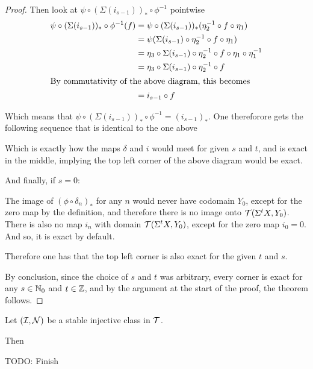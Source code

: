 \begin{proof}
    Then look at \( \psi \circ (\Sigma(i_{s-1}))_* \circ \phi^{-1} \) pointwise
    \begin{align*}
        \psi \circ (\Sigma(i_{s-1}))_* \circ \phi^{-1} ( f ) &= \psi \circ (\Sigma(i_{s-1}))_* ( \eta_2^{-1} \circ f \circ \eta_1 ) \\
        &= \psi ( \Sigma(i_{s - 1}) \circ \eta_2^{-1} \circ f \circ \eta_1 ) \\
        &= \eta_3 \circ \Sigma(i_{s - 1}) \circ \eta_2^{-1} \circ f \circ \eta_1 \circ \eta_1^{-1} \\
        &= \eta_3 \circ \Sigma(i_{s - 1}) \circ \eta_2^{-1} \circ f \\
        \intertext{By commutativity of the above diagram, this becomes}
        &= i_{s - 1} \circ f
    \end{align*}

    Which means that \( \psi \circ (\Sigma(i_{s-1}))_* \circ \phi^{-1} = ( i_{s - 1} )_* \). One thereforore gets the following sequence that is identical to the one above
    \begin{center}
    \end{center}
    Which is exactly how the maps \( \delta \) and \( i \) would meet for given \( s \) and \( t \), and is exact in the middle, implying the top left corner of the above diagram would be exact.

    And finally, if \( s = 0 \):

    The image of \( (\phi \circ \delta_n)_* \) for any \( n \) would never have codomain \( Y_0 \), except for the zero map by the definition, and therefore there is no image onto \( {\mathcal{T}}(\Sigma^t X, Y_0) \). There is also no map \( i_n \) with domain \( {\mathcal{T}}(\Sigma^t X , Y_0) \), except for the zero map \( i_0 = 0 \). And so, it is exact by default.

    Therefore one has that the top left corner is also exact for the given \( t \) and \( s \).

    By conclusion, since the choice of \( s \) and \( t \) was arbitrary, every corner is exact for any \( s \in {\mathbb{N}}_0 \) and \( t \in {\mathbb{Z}} \), and by the argument at the start of the proof, the theorem follows.
\end{proof}

\begin{definition}
    Let \( ({\mathcal{I}}, {\mathcal{N}}) \) be a stable injective class in \( {\mathcal{T}} \).

    Then

    TODO: Finish
\end{definition}
